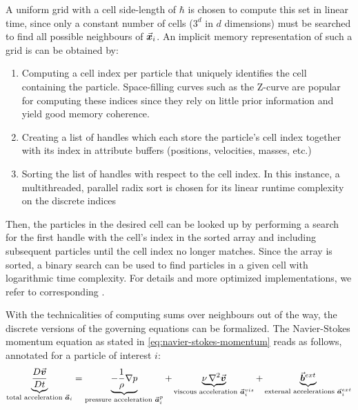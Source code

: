 A uniform grid with a cell side-length of $\hbar$ is chosen to compute this set in linear time, since only a constant number of cells ($3^d$ in $d$ dimensions) must be searched to find all possible neighbours of $\vec{\bm{x}}_i$. An implicit memory representation of such a grid is can be obtained by:
\begin{enumerate}
  \item Computing a cell index per particle that uniquely identifies the cell containing the particle. Space-filling curves such as the Z-curve are popular for computing these indices since they rely on little prior information and yield good memory coherence\autocite*{2014-sph-sruvey-eurographics}.
  \item Creating a list of handles which each store the particle's cell index together with its index in attribute buffers (positions, velocities, masses, etc.)
  \item Sorting the list of handles with respect to the cell index. In this instance, a multithreaded, parallel radix sort is chosen for its linear runtime complexity on the discrete indices
\end{enumerate}
Then, the particles in the desired cell can be looked up by performing a search for the first handle with the cell's index in the sorted array and including subsequent particles until the cell index no longer matches. Since the array is sorted, a binary search can be used to find particles in a given cell with logarithmic time complexity. For details and more optimized implementations, we refer to corresponding \cite[Literature]{compressed-neighbour-lists}.

With the technicalities of computing sums over neighbours out of the way, the discrete versions of the governing equations can be formalized. The Navier-Stokes momentum equation as stated in \autoref{eq:navier-stokes-momentum} reads as follows, annotated for a particle of interest $i$:
\begin{equation}
  \underbrace{\frac{D\vec{\bm{v}}}{Dt}}_{\text{total acceleration }\vec{\bm{a}}_i}=\underbrace{-\frac{1}{\rho}\nabla p}_{\text{pressure acceleration } \vec{\bm{a}}_i^{p}}+\underbrace{\nu\mathop{}\!\mathbin\nabla^2\vec{\bm{v}}}_{\text{viscous acceleration } \vec{\bm{a}}_i^{vis}}+\underbrace{\vec{\bm{b}}^{ext}}_{\text{external accelerations } \vec{\bm{a}}_i^{ext}}
\end{equation}

